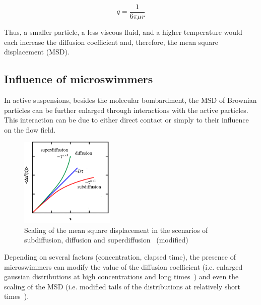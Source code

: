 \begin{equation}
q=\frac{1}{6 \pi \mu r}
\end{equation}

Thus, a smaller particle, a less viscous fluid, and a higher temperature would each increase the diffusion coefficient and, therefore, the mean square displacement (MSD). 

\subsection{Influence of microswimmers}
\label{brownian_microswimmers}

In active suspensions, besides the molecular bombardment, the MSD of Brownian particles can be further enlarged through interactions with the active particles. This interaction can be due to either direct contact or simply to their influence on the flow field.

\begin{figure}[H]
	\centering
	\includegraphics[width=0.4\textwidth]{archivos/SubSuperDif.png}
	\caption{Scaling of the mean square displacement in the scenarios of subdiffusion, diffusion and superdiffusion~\cite{MacKintosh7138} (modified)}
	\label{SSDif}
\end{figure}

Depending on several factors (concentration, elapsed time), the presence of microswimmers can modify the value of the diffusion coefficient (i.e. enlarged gaussian distributions at high concentrations and long times~\cite{Kurtuldu2011}) and even the scaling of the MSD (i.e. modified tails of the distributions at relatively short times~\cite{Kurtuldu2011}). 